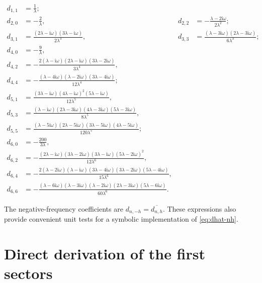 \documentclass[11pt,oneside]{article}
\numberwithin{equation}{section}
\theoremstyle{plain}
\theoremstyle{definition}
\theoremstyle{remark}
\newcommand{\ii}{\mathrm i}
\begin{document}
\begingroup
\small
\begin{align*}
 d_{1,1}&=\frac1\lambda;\\[0.35em]
 d_{2,0}&=-\frac2\lambda,
 &d_{2,2}&=-\frac{\lambda-2\ii\omega}{2\lambda^2};\\[0.35em]
 d_{3,1}&=\frac{(2\lambda-\ii\omega)(3\lambda-\ii\omega)}
                    {2\lambda^3},
 &d_{3,3}&=\frac{(\lambda-3\ii\omega)(2\lambda-3\ii\omega)}
                    {6\lambda^3};\\[0.35em]
 d_{4,0}&=-\frac9\lambda,\\
 d_{4,2}&=-\frac{2(\lambda-\ii\omega)(2\lambda-\ii\omega)
                    (3\lambda-2\ii\omega)}{3\lambda^4},\\
 d_{4,4}&=-\frac{(\lambda-4\ii\omega)(\lambda-2\ii\omega)
                    (3\lambda-4\ii\omega)}{12\lambda^4};\\[0.35em]
 d_{5,1}&=\frac{(3\lambda-\ii\omega)(4\lambda-\ii\omega)^2
                    (5\lambda-\ii\omega)}{12\lambda^5},\\
 d_{5,3}&=\frac{(\lambda-\ii\omega)(2\lambda-3\ii\omega)
                    (4\lambda-3\ii\omega)(5\lambda-3\ii\omega)}
                    {8\lambda^5},\\
 d_{5,5}&=\frac{(\lambda-5\ii\omega)(2\lambda-5\ii\omega)
                    (3\lambda-5\ii\omega)(4\lambda-5\ii\omega)}
                    {120\lambda^5};\\[0.35em]
 d_{6,0}&=-\frac{200}{3\lambda},\\
 d_{6,2}&=-\frac{(2\lambda-\ii\omega)(3\lambda-2\ii\omega)
                    (3\lambda-\ii\omega)(5\lambda-2\ii\omega)^2}
                    {12\lambda^6},\\
 d_{6,4}&=-\frac{2(\lambda-2\ii\omega)(\lambda-\ii\omega)
                    (3\lambda-4\ii\omega)(3\lambda-2\ii\omega)
                    (5\lambda-4\ii\omega)}{15\lambda^6},\\
 d_{6,6}&=-\frac{(\lambda-6\ii\omega)(\lambda-3\ii\omega)
                    (\lambda-2\ii\omega)(2\lambda-3\ii\omega)
                    (5\lambda-6\ii\omega)}{60\lambda^6}.
\end{align*}
\endgroup

The negative-frequency coefficients are
\(d_{n,-h}=\overline{d_{n,h}}\).  These expressions also provide convenient
unit tests for a symbolic implementation of \cref{eq:dhat-nh}.

\section{Direct derivation of the first sectors}\label{app:direct-sectors}
\end{document}
